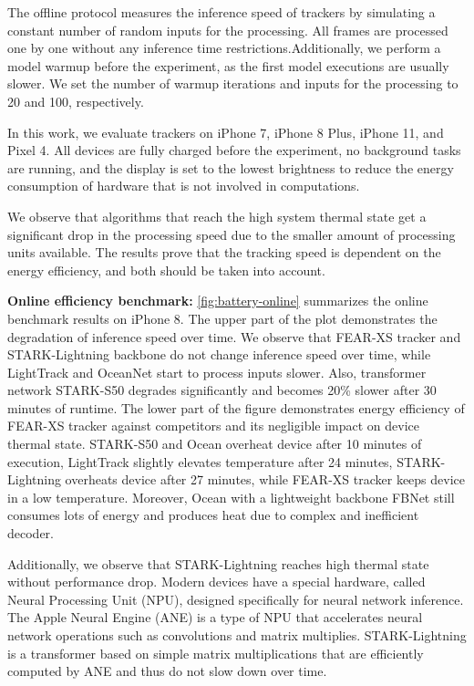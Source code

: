 \documentclass[runningheads]{llncs}
\begin{document}
The offline protocol measures the inference speed of trackers by simulating a constant number of random inputs for the processing.
All frames are processed one by one without any inference time restrictions.Additionally, we perform a model warmup before the experiment, as the first model executions are usually slower. We set the number of warmup iterations and inputs for the processing to 20 and 100, respectively.

In this work, we evaluate trackers on iPhone 7, iPhone 8 Plus, iPhone 11, and Pixel 4. All devices are fully charged before the experiment, no background tasks are running, and the display is set to the lowest brightness to reduce the energy consumption of hardware that is not involved in computations.

We observe that algorithms that reach the high system thermal state get a significant drop in the processing speed due to the smaller amount of processing units available. The results prove that the tracking speed is dependent on the energy efficiency, and both should be taken into account. 

\textbf{Online efficiency benchmark:} \cref{fig:battery-online} summarizes the online benchmark results on iPhone 8. The upper part of the plot demonstrates the degradation of inference speed over time. We observe that FEAR-XS tracker and STARK-Lightning \cite{stark_lightning} backbone do not change inference speed over time, while LightTrack \cite{LightTrack} and OceanNet \cite{Ocean} start to process inputs slower. Also, transformer network STARK-S50 degrades significantly and becomes 20\% slower after 30 minutes of runtime. The lower part of the figure demonstrates energy efficiency of FEAR-XS tracker against competitors and its negligible impact on device thermal state. STARK-S50 and Ocean overheat device after 10 minutes of execution, LightTrack slightly elevates temperature after 24 minutes, STARK-Lightning overheats device after 27 minutes, while FEAR-XS tracker keeps device in a low temperature. Moreover, Ocean with a lightweight backbone FBNet \cite{FBNet} still consumes lots of energy and produces heat due to complex and inefficient decoder.

Additionally, we observe that STARK-Lightning reaches high thermal state without performance drop. Modern devices have a special hardware, called Neural Processing Unit (NPU), designed specifically for neural network inference. The Apple Neural Engine (ANE) is a type of NPU that accelerates neural network operations such as convolutions and matrix multiplies. STARK-Lightning is a transformer based on simple matrix multiplications that are efficiently computed by ANE and thus do not slow down over time.
\end{document}
